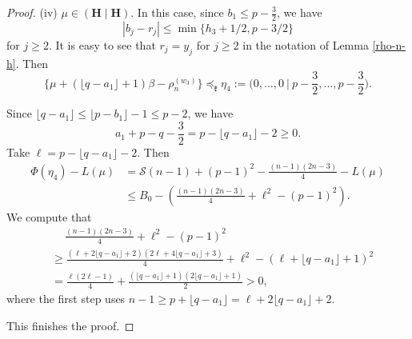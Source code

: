 \documentclass[11pt]{amsart}
\theoremstyle{plain}
\theoremstyle{definition}
\newcommand{\mfk}{\mathfrak{k}}
\newcommand{\caS}{\mathcal{S}}
\begin{document}
\begin{proof}
		(iv) $\mu\in (\textbf{H}\mid \textbf{H})$. In this case,
		since $b_1\le p-\frac{3}{2}$, we have
		\[|b_j-r_j|\le \min\{h_3+1/2, p-3/2\}\]
		for $j\ge 2$.  It is easy to see that $r_j=y_j$ for $j\ge 2$ in the notation of Lemma \ref{rho-n-h}. Then
\[\{\mu+(\lfloor q-a_1\rfloor+1)\beta-\rho_n^{(w_3)}\}\preceq_\mfk \eta_4:=\bigg(0,\dots,0\ \bigg|\  p-\frac{3}{2},\dots,p-\frac{3}{2}\bigg).\]
		
		Since $\lfloor q-a_1\rfloor\le \lfloor p-b_1\rfloor-1\le p-2$, we have
		\[a_1+p-q-\frac{3}{2}=p-\lfloor q-a_1\rfloor-2\ge 0.\]
		Take $\ell=p-\lfloor q-a_1\rfloor-2$. Then
		\begin{align*}
			\Phi(\eta_4)-L(\mu)&=\caS(n-1)+(p-1)^2-\frac{(n-1)(2n-3)}{4}-L(\mu)\\
			&\le B_0-\left(\frac{(n-1)(2n-3)}{4}+\ell^2-(p-1)^2\right).
		\end{align*}
		We compute that
		\begin{align*}
			&\ \quad\frac{(n-1)(2n-3)}{4}+\ell^2-(p-1)^2\\
			&\ge \frac{(\ell+2\lfloor q-a_1\rfloor+2)(2\ell+4\lfloor q-a_1\rfloor+3)}{4}+\ell^2-(\ell+\lfloor q-a_1\rfloor+1)^2\\
			&=\frac{\ell(2\ell-1)}{4}+\frac{(\lfloor q-a_1\rfloor+1)(2\lfloor q-a_1\rfloor+1)}{2}>0,
		\end{align*}
		where the first step uses $n-1\ge p+\lfloor q-a_1\rfloor=\ell+2\lfloor q-a_1\rfloor+2$.

This finishes the proof.
\end{proof}
\end{document}
